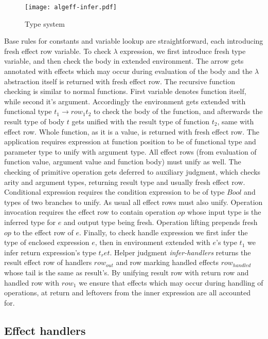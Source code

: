\documentclass[inz, english, shortabstract]{iithesis}
\begin{document}
\begin{figure}
  \centering
  \texttt{[image: algeff-infer.pdf]}
  \caption{Type system} 
  \label{fig:algeff-infer} 
\end{figure}

Base rules for constants and variable lookup are straightforward, each introducing fresh effect row variable.
To check $ \lambda $ expression, we first introduce fresh type variable, and then check the body in extended environment.
The arrow gets annotated with effects which may occur during evaluation of the body and the $ \lambda $ abstraction itself is returned with fresh effect row.
The recursive function checking is similar to normal functions.
First variable denotes function itself, while second it's argument.
Accordingly the environment gets extended with functional type $ t_1 \rightarrow row_1 t_2 $ to check the body of the function, and afterwards the result type of body $ t $ gets unified with the result type of function $ t_2 $, same with effect row.
Whole function, as it is a value, is returned with fresh effect row.
The application requires expression at function position to be of functional type and parameter type to unify with argument type.
All effect rows (from evaluation of function value, argument value and function body) must unify as well.
The checking of primitive operation gets deferred to auxiliary judgment, which checks arity and argument types, returning result type and usually fresh effect row.
Conditional expression requires the condition expression to be of type $ Bool $ and types of two branches to unify.
As usual all effect rows must also unify.
Operation invocation requires the effect row to contain operation $ op $ whose input type is the inferred type for $ e $ and output type being fresh.
Operation lifting prepends fresh $ op $ to the effect row of $ e $.
Finally, to check handle expression we first infer the type of enclosed expression $ e $, then in environment extended with $e$'s type $ t_1 $ we infer return expression's type $ t_ret $.
Helper judgment \textit{infer-handlers} returns the result effect row of handlers $ row_{out} $ and row marking handled effects $ row_{handled} $ whose tail is the same as result's.
By unifying result row with return row and handled row with $ row_1 $ we ensure that effects which may occur during handling of operations, at return and leftovers from the inner expression are all accounted for.

\subsection{Effect handlers}
\end{document}
